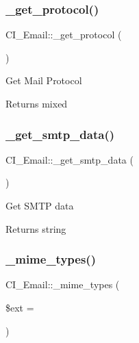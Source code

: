 \subsubsection{\texorpdfstring{\+\_\+get\+\_\+protocol()}{\_get\_protocol()}}
{\footnotesize\ttfamily C\+I\+\_\+\+Email\+::\+\_\+get\+\_\+protocol (\begin{DoxyParamCaption}{ }\end{DoxyParamCaption})\hspace{0.3cm}{\ttfamily [protected]}}

Get Mail Protocol

\begin{DoxyReturn}{Returns}
mixed 
\end{DoxyReturn}
\mbox{\label{class_c_i___email_a0d301ffef6de8400d70f17463324581a}} 
\subsubsection{\texorpdfstring{\+\_\+get\+\_\+smtp\+\_\+data()}{\_get\_smtp\_data()}}
{\footnotesize\ttfamily C\+I\+\_\+\+Email\+::\+\_\+get\+\_\+smtp\+\_\+data (\begin{DoxyParamCaption}{ }\end{DoxyParamCaption})\hspace{0.3cm}{\ttfamily [protected]}}

Get S\+M\+TP data

\begin{DoxyReturn}{Returns}
string 
\end{DoxyReturn}
\mbox{\label{class_c_i___email_a1e05091d048a1756b0aff6e869016018}} 
\subsubsection{\texorpdfstring{\+\_\+mime\+\_\+types()}{\_mime\_types()}}
{\footnotesize\ttfamily C\+I\+\_\+\+Email\+::\+\_\+mime\+\_\+types (\begin{DoxyParamCaption}\item[{}]{\$ext = {\ttfamily \textquotesingle{}\textquotesingle{}} }\end{DoxyParamCaption})\hspace{0.3cm}{\ttfamily [protected]}}

